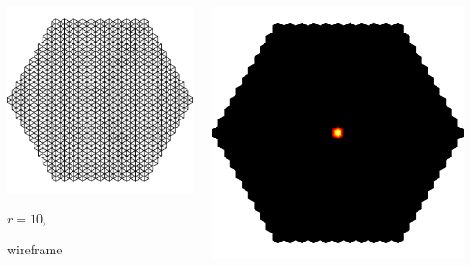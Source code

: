 \documentclass[aspectratio=169,t]{beamer}
\begin{document}
{\begin{columns}
\begin{column}{0.22\textwidth}
			\includegraphics[width=.85\textwidth]{data/synthetic_meshes/hexagonal_tessellation_Dirac_delta_10_v1057_f1986_wireframe.png}
			{\footnotesize
				\par \vspace{-1mm} $r=10$,
				\par \vspace{-1mm} wireframe
			}
		\end{column}
		\begin{column}{0.22\textwidth}
			\centering
			\includegraphics[width=.85\textwidth]{data/synthetic_meshes/hexagonal_tessellation_Dirac_delta_10_v1057_f1986_funcvals_0iter_crop.png}

\end{column}
\end{columns}}
\end{document}

